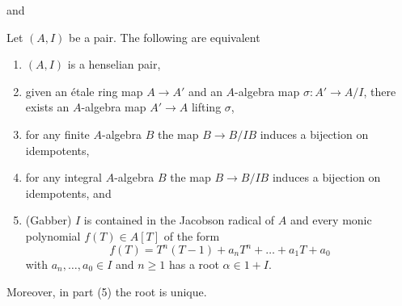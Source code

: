 %
\begin{lemma}
\label{lemma-characterize-henselian-pair}
\begin{reference}
\cite[Chapter XI]{Henselian} and \cite[Proposition 1]{Gabber-henselian}
\end{reference}
Let $(A, I)$ be a pair. The following are equivalent
\begin{enumerate}
\item $(A, I)$ is a henselian pair,
\item given an \'etale ring map $A \to A'$ and an $A$-algebra map
$\sigma : A' \to A/I$, there exists an $A$-algebra map $A' \to A$
lifting $\sigma$,
\item for any finite $A$-algebra $B$ the map $B \to B/IB$ induces
a bijection on idempotents,
\item for any integral $A$-algebra $B$ the map $B \to B/IB$ induces
a bijection on idempotents, and
\item (Gabber) $I$ is contained in the Jacobson radical of $A$ and
every monic polynomial $f(T) \in A[T]$ of the form
$$
f(T) = T^n(T - 1) + a_n T^n + \ldots + a_1 T + a_0
$$
with $a_n, \ldots, a_0 \in I$ and $n \ge 1$ has a root $\alpha \in 1 + I$.
\end{enumerate}
Moreover, in part (5) the root is unique.
\end{lemma}

